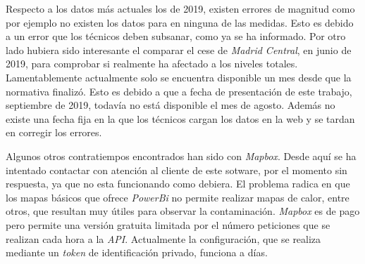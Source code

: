 Respecto a los datos más actuales los de 2019, existen errores de magnitud como por ejemplo no existen los datos para  en ninguna de las medidas. Esto es debido a un error que los técnicos deben subsanar, como ya se ha informado. Por otro lado hubiera sido interesante el comparar el cese de \textit{Madrid Central}, en junio de 2019, para comprobar si realmente ha afectado a los niveles totales. Lamentablemente actualmente solo se encuentra disponible un mes desde que la normativa finalizó. Esto es debido a que a fecha de presentación de este trabajo, septiembre de 2019, todavía no está disponible el mes de agosto. Además no existe una fecha fija en la que los técnicos cargan los datos en la web y se tardan en corregir los errores.

Algunos otros contratiempos encontrados han sido con \textit{Mapbox}. Desde aquí se ha intentado contactar con atención al cliente de este sotware, por el momento sin respuesta, ya que no esta funcionando como debiera. El problema radica en que los mapas básicos que ofrece \textit{PowerBi} no permite realizar mapas de calor, entre otros, que resultan muy útiles para observar la contaminación. \textit{Mapbox} es de pago pero permite una versión gratuita limitada por el número peticiones que se realizan cada hora a la \textit{API}. Actualmente la configuración, que se realiza mediante un \textit{token} de identificación privado, funciona a días. 
 

